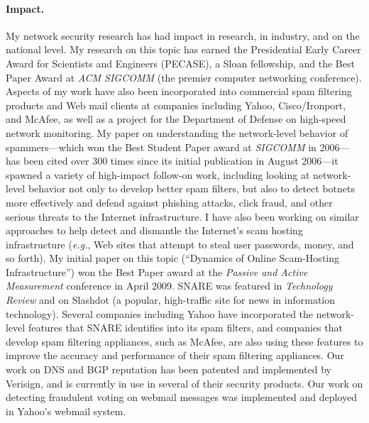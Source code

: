 \documentclass{article}
\newcommand{\eg}{{\em e.g.}}
\begin{document}
\paragraph{Impact.}
My network security research has had impact in research, in industry,
and on the national level.  My research on this topic has earned the
Presidential Early Career Award for Scientists and Engineers (PECASE), a
Sloan fellowship, and the Best Paper Award at {\em ACM SIGCOMM} (the
premier computer networking conference).  Aspects of my work have also
been incorporated into commercial spam filtering products and Web mail
clients at companies including Yahoo, Cisco/Ironport, and McAfee, as
well as a project for the Department of Defense on high-speed network
monitoring.  My paper on understanding the network-level behavior of
spammers---which won the Best Student Paper award at {\em SIGCOMM} in
2006---has been cited over 300 times since its initial publication in
August 2006---it spawned a variety of high-impact follow-on work,
including looking at network-level behavior not only to develop better
spam filters, but also to detect botnets more effectively and defend
against phishing attacks, click fraud, and other serious threats to the
Internet infrastructure.  I have also been working on similar approaches
to help detect and dismantle the Internet's scam hosting infrastructure
(\eg, Web sites that attempt to steal user passwords, money, and so
forth).  My initial paper on this topic (``Dynamics of Online
Scam-Hosting Infrastructure'') won the Best Paper award at the {\em
Passive and Active Measurement} conference in April 2009.  SNARE was
featured in {\em Technology Review} and on Slashdot (a popular,
high-traffic site for news in information technology).  Several
companies including Yahoo have incorporated the network-level features
that SNARE identifies into its spam filters, and companies that develop
spam filtering appliances, such as McAfee, are also using these features
to improve the accuracy and performance of their spam filtering
appliances.  Our work on DNS and BGP reputation has been patented and
implemented by Verisign, and is currently in use in several of their
security products.  Our work on detecting fraudulent voting on webmail
messages was implemented and deployed in Yahoo's webmail system.
\end{document}
